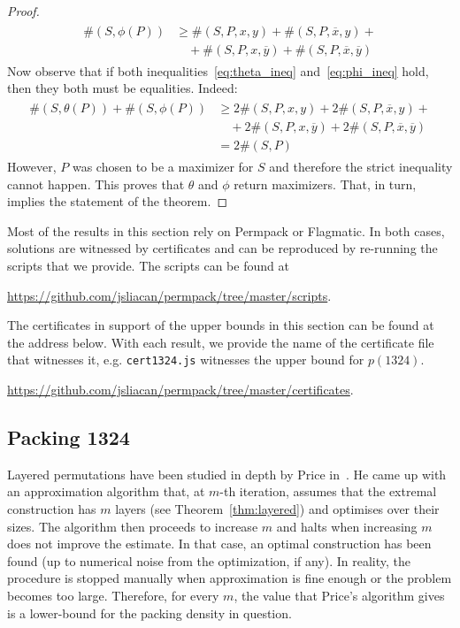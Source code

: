 \documentclass[12pt, a4paper, twoside]{report}
\begin{document}
\begin{proof}
\begin{align}
  \begin{aligned}
  \#(S,\phi(P)) &\geq \#(S,P,x,y) + \#(S,P,\overline{x},y) + \\
                &\quad+\#(S,P,x,\overline{y}) + \#(S,P,\overline{x},\overline{y})
              \end{aligned}
    \label{eq:phi_ineq}
\end{align}
Now observe that if both inequalities~\eqref{eq:theta_ineq} and~\eqref{eq:phi_ineq} hold, then they both must be equalities. Indeed:
\begin{align}
  \begin{aligned}
    \#(S,\theta(P)) + \#(S,\phi(P)) &\geq  2\#(S,P,x,y) + 2\#(S,P,\overline{x},y) + \\
                &\quad+2\#(S,P,x,\overline{y}) + 2\#(S,P,\overline{x},\overline{y})\\
                &= 2\#(S,P)
  \end{aligned}
      \label{eq:infactequality}
\end{align}
However, $P$ was chosen to be a maximizer for $S$ and therefore the strict inequality cannot happen. This proves that $\theta$ and $\phi$ return maximizers. That, in turn, implies the statement of the theorem.
\end{proof}

Most of the results in this section rely on Permpack or Flagmatic. In both cases, solutions are witnessed by certificates and can be reproduced by re-running the scripts that we provide. The scripts can be found at

\url{https://github.com/jsliacan/permpack/tree/master/scripts}.

\noindent The certificates in support of the upper bounds in this section can be found at the address below. With each result, we provide the name of the certificate file that witnesses it, e.g. \texttt{cert1324.js} witnesses the upper bound for $p(1324)$.

\url{https://github.com/jsliacan/permpack/tree/master/certificates}.



\subsection{Packing 1324}
Layered permutations have been studied in depth by Price in~\cite{price1997packing}. He came up with an approximation algorithm that, at $m$-th iteration, assumes that the extremal construction has $m$ layers (see Theorem~\ref{thm:layered}) and optimises over their sizes. The algorithm then proceeds to increase $m$ and halts when increasing $m$ does not improve the estimate. In that case, an optimal construction has been found (up to numerical noise from the optimization, if any). In reality, the procedure is stopped manually when approximation is fine enough or the problem becomes too large. Therefore, for every $m$, the value that Price's algorithm gives is a lower-bound for the packing density in question.
\end{document}
